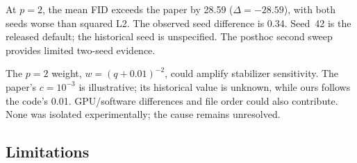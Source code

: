 At $p=2$, the mean FID exceeds the paper by 28.59 ($\Delta=-28.59$), with both seeds worse than squared L2. The observed seed difference is 0.34. Seed~42 is the released default; the historical seed is unspecified. The posthoc second sweep provides limited two-seed evidence.

The $p=2$ weight, $w=(q+0.01)^{-2}$, could amplify stabilizer sensitivity. The paper's $c=10^{-3}$ is illustrative; its historical value is unknown, while ours follows the code's 0.01. GPU/software differences and file order could also contribute. None was isolated experimentally; the cause remains unresolved.

\subsection{Limitations}
\label{sec:simon-limitations}

